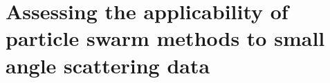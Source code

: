 
\chapter{Assessing the applicability of particle swarm methods to small angle scattering data} %

\label{smallangle} %




\pagebreak
%
%
%
%
%

\renewcommand\bibsection{\section{\refname}}


